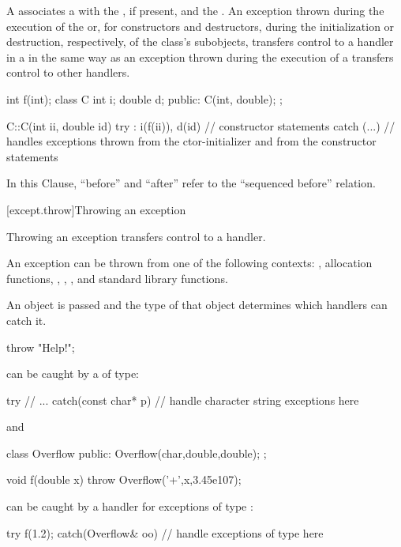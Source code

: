 \pnum
{}%
%
A
associates a
with the
,
if present, and the
.
An exception
thrown during the execution of the
or, for constructors and destructors, during the initialization or
destruction, respectively, of the class's subobjects,
transfers control to a handler in a
in the same way as an exception thrown during the execution of a
transfers control to other handlers.
\begin{example}
\begin{codeblock}
int f(int);
class C {
  int i;
  double d;
public:
  C(int, double);
};

C::C(int ii, double id)
try : i(f(ii)), d(id) {
    // constructor statements
} catch (...) {
    // handles exceptions thrown from the ctor-initializer and from the constructor statements
}
\end{codeblock}
\end{example}

\pnum
In this Clause, ``before'' and ``after'' refer to the
``sequenced before'' relation.

[except.throw]{Throwing an exception}%
%

\pnum
Throwing an exception transfers control to a handler.
\begin{note}
An exception can be thrown from one of the following contexts:
,
allocation functions,
,
,
, and standard library
functions.
\end{note}
An object is passed and the type of that object determines which handlers
can catch it.
\begin{example}
\begin{codeblock}
throw "Help!";
\end{codeblock}
can be caught by a
of
type:
\begin{codeblock}
try {
    // ...
} catch(const char* p) {
    // handle character string exceptions here
}
\end{codeblock}
and
\begin{codeblock}
class Overflow {
public:
    Overflow(char,double,double);
};

void f(double x) {
    throw Overflow('+',x,3.45e107);
}
\end{codeblock}
can be caught by a handler for exceptions of type
:
\begin{codeblock}
try {
    f(1.2);
} catch(Overflow& oo) {
    // handle exceptions of type  here
}
\end{codeblock}
\end{example}

